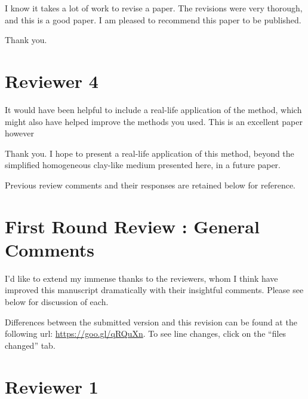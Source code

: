 \documentclass[answers,12pt]{exam}
\begin{document}
\begin{questions}
\question I know it takes a lot of work to revise a paper. The revisions were very thorough, and this is a good paper. I am pleased to recommend this paper to be published. 
\begin{solution}
        Thank you.
\end{solution}


\section*{Reviewer 4}

\question It would have been helpful to include a real-life application of the method, which might also have helped improve the methods you used.  This is an excellent paper however
\begin{solution}
Thank you. I hope to present a real-life application of this method, beyond the
simplified homogeneous clay-like medium presented here, in a future paper.
\end{solution}


\noindent\makebox[\linewidth]{\rule{\paperwidth}{0.4pt}}
Previous review comments and their responses are retained below for
reference.
\noindent\makebox[\linewidth]{\rule{\paperwidth}{0.4pt}}



\section*{First Round Review : General Comments}
I'd like to extend my immense thanks to the reviewers, whom I think have
improved this manuscript dramatically with their insightful comments. Please
see below for discussion of each.  

Differences between the submitted version and this revision can be found at the 
following url: \url{https://goo.gl/qRQuXn}. To see line changes, click on the 
``files changed'' tab.

\section*{Reviewer 1}


\end{questions}
\end{document}
